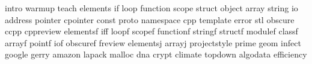 intro
warmup
teach
elements
if
loop
function
scope
struct
object
array
string
io
address
pointer
cpointer
const
proto
namespace
cpp
template
error
stl
obscure
ccpp
cppreview
elementsf
iff
loopf
scopef
functionf
stringf
structf
modulef
classf
arrayf
pointf
iof
obscuref
freview
elementsj
arrayj
projectstyle
prime
geom
infect
google
gerry
amazon
lapack
malloc
dna
crypt
climate
topdown
algodata
efficiency
